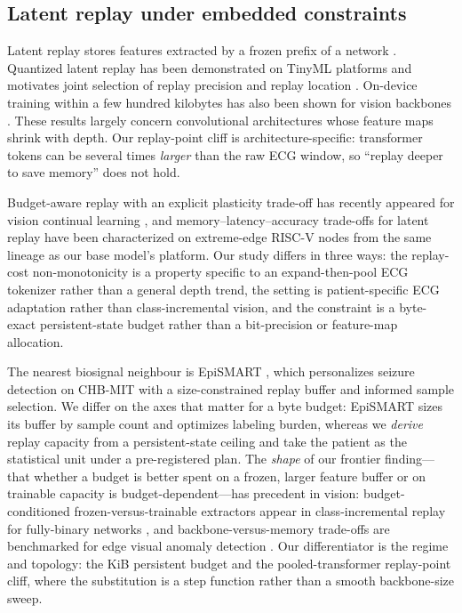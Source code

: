 \subsection{Latent replay under embedded constraints}

Latent replay stores features extracted by a frozen prefix of a network
\cite{pellegrini2020latent}. Quantized latent replay has been demonstrated on
TinyML platforms and motivates joint selection of replay precision and replay
location \cite{ravaglia2021tinyml}. On-device training within a few hundred
kilobytes has also been shown for vision backbones \cite{lin2022ondevice}. These
results largely concern convolutional architectures whose feature maps shrink
with depth. Our replay-point cliff is architecture-specific: transformer tokens
can be several times \emph{larger} than the raw ECG window, so ``replay deeper
to save memory'' does not hold.

Budget-aware replay with an explicit plasticity trade-off has recently appeared
for vision continual learning \cite{zhang2026amrecl}, and memory--latency--accuracy
trade-offs for latent replay have been characterized on extreme-edge RISC-V nodes
\cite{ravaglia2020memlatacc} from the same lineage as our base model's platform.
Our study differs in three ways: the replay-cost non-monotonicity is a property
specific to an expand-then-pool ECG tokenizer rather than a general depth trend,
the setting is patient-specific ECG adaptation rather than class-incremental
vision, and the constraint is a byte-exact persistent-state budget rather than a
bit-precision or feature-map allocation.

The nearest biosignal neighbour is EpiSMART \cite{shahbazinia2025epismart}, which
personalizes seizure detection on CHB-MIT with a size-constrained replay buffer
and informed sample selection. We differ on the axes that matter for a byte
budget: EpiSMART sizes its buffer by sample count and optimizes labeling burden,
whereas we \emph{derive} replay capacity from a persistent-state ceiling and take
the patient as the statistical unit under a pre-registered plan. The \emph{shape}
of our frontier finding---that whether a budget is better spent on a frozen,
larger feature buffer or on trainable capacity is budget-dependent---has
precedent in vision: budget-conditioned frozen-versus-trainable extractors appear
in class-incremental replay for fully-binary networks
\cite{bassobert2025binaryreplay}, and backbone-versus-memory trade-offs are
benchmarked for edge visual anomaly detection \cite{barusco2026vadedge}. Our
differentiator is the regime and topology: the KiB persistent budget and the
pooled-transformer replay-point cliff, where the substitution is a step function
rather than a smooth backbone-size sweep.

